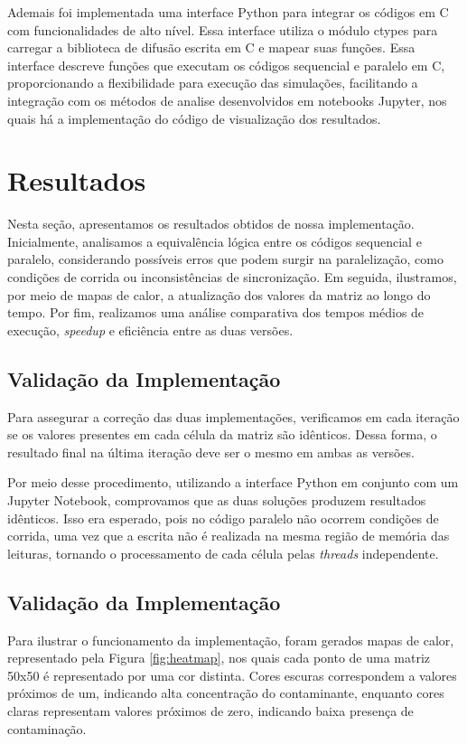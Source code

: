 \documentclass[12pt]{article}
\begin{document}
Ademais foi implementada uma interface Python para integrar os códigos em C com funcionalidades de alto nível. Essa interface utiliza o módulo ctypes para carregar a biblioteca de difusão escrita em C e mapear suas funções. Essa interface descreve funções que executam os códigos sequencial e paralelo em C, proporcionando a flexibilidade para execução das simulações, facilitando a integração com os métodos de analise desenvolvidos em notebooks Jupyter, nos quais há a implementação do código de visualização dos resultados.

\section{Resultados}

Nesta seção, apresentamos os resultados obtidos de nossa implementação. Inicialmente, analisamos a equivalência lógica entre os códigos sequencial e paralelo, considerando possíveis erros que podem surgir na paralelização, como condições de corrida ou inconsistências de sincronização. Em seguida, ilustramos, por meio de mapas de calor, a atualização dos valores da matriz ao longo do tempo. Por fim, realizamos uma análise comparativa dos tempos médios de execução, \textit{speedup} e eficiência entre as duas versões.

\subsection{Validação da Implementação}

Para assegurar a correção das duas implementações, verificamos em cada iteração se os valores presentes em cada célula da matriz são idênticos. Dessa forma, o resultado final na última iteração deve ser o mesmo em ambas as versões.

Por meio desse procedimento, utilizando a interface Python em conjunto com um Jupyter Notebook, comprovamos que as duas soluções produzem resultados idênticos. Isso era esperado, pois no código paralelo não ocorrem condições de corrida, uma vez que a escrita não é realizada na mesma região de memória das leituras, tornando o processamento de cada célula pelas \textit{threads} independente.

\subsection{Validação da Implementação}

Para ilustrar o funcionamento da implementação, foram gerados mapas de calor, representado pela Figura \ref{fig:heatmap}, nos quais cada ponto de uma matriz 50x50 é representado por uma cor distinta. Cores escuras correspondem a valores próximos de um, indicando alta concentração do contaminante, enquanto cores claras representam valores próximos de zero, indicando baixa presença de contaminação.
\end{document}
